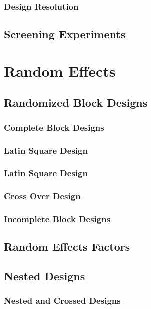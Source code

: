 \subsubsection{Design Resolution}


\subsection{Screening Experiments}

\section{Random Effects}

\subsection{Randomized Block Designs}

\subsubsection{Complete Block Designs}


\subsubsection{Latin Square Design}

\subsubsection{Latin Square Design}

\subsubsection{Cross Over Design}

\subsubsection{Incomplete Block Designs}


\subsection{Random Effects Factors}

\subsection{Nested Designs}


\subsubsection{Nested and Crossed Designs}

